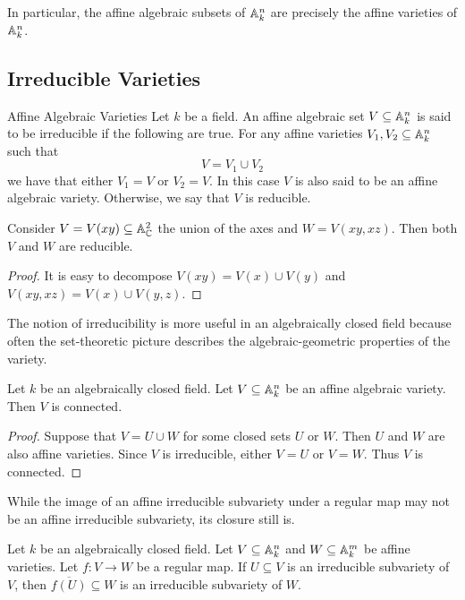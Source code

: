 \documentclass[a4paper]{article}
\begin{document}
In particular, the affine algebraic subsets of $\mathbb{A}_k^n$ are precisely the affine varieties of $\mathbb{A}_k^n$. 

\subsection{Irreducible Varieties}
\begin{defn}{Affine Algebraic Varieties}{} Let $k$ be a field. An affine algebraic set $V\subseteq\mathbb{A}_k^n$ is said to be irreducible if the following are true. For any affine varieties $V_1,V_2\subseteq\mathbb{A}_k^n$ such that $$V=V_1\cup V_2$$ we have that either $V_1=V$ or $V_2=V$. In this case $V$ is also said to be an affine algebraic variety. Otherwise, we say that $V$ is reducible. 
\end{defn}

\begin{eg}{}{} Consider $V=V(xy)\subseteq\mathbb{A}_{\mathbb{C}}^2$ the union of the axes and $W=V(xy,xz)$. Then both $V$ and $W$ are reducible. \tcbline
\begin{proof}
It is easy to decompose $V(xy)=V(x)\cup V(y)$ and $V(xy,xz)=V(x)\cup V(y,z)$. 
\end{proof}
\end{eg}

The notion of irreducibility is more useful in an algebraically closed field because often the set-theoretic picture describes the algebraic-geometric properties of the variety. 

\begin{prp}{}{} Let $k$ be an algebraically closed field. Let $V\subseteq\mathbb{A}_k^n$ be an affine algebraic variety. Then $V$ is connected. \tcbline
\begin{proof}
Suppose that $V=U\cup W$ for some closed sets $U$ or $W$. Then $U$ and $W$ are also affine varieties. Since $V$ is irreducible, either $V=U$ or $V=W$. Thus $V$ is connected. 
\end{proof}
\end{prp}

While the image of an affine irreducible subvariety under a regular map may not be an affine irreducible subvariety, its closure still is. 

\begin{lmm}{}{} Let $k$ be an algebraically closed field. Let $V\subseteq\mathbb{A}_k^n$ and $W\subseteq\mathbb{A}_k^m$ be affine varieties. Let $f:V\to W$ be a regular map. If $U\subseteq V$ is an irreducible subvariety of $V$, then $\overline{f(U)}\subseteq W$ is an irreducible subvariety of $W$. 
\end{lmm}
\end{document}
